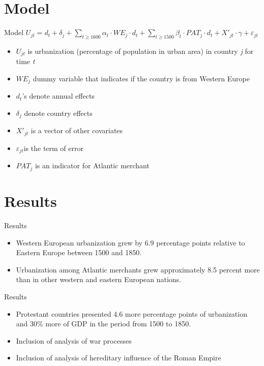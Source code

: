 \documentclass[pdftex,12pt,xcolor=pdftex,table]{beamer}
\theoremstyle{definition}
\theoremstyle{remark}
\numberwithin{equation}{section}
\numberwithin{figure}{section}
\begin{document}
	\section{Model}
		\begin{frame}{Model}
			\justifying
			\centering
			\textit{$U_{jt} = d_{t} + \delta_{j} + \sum_{t\geq1600} \alpha_{t} \cdot WE_{j} \cdot d_{t} +\sum_{t\geq1500} \beta_t\cdot PAT_j \cdot d_t + X'_{jt}\cdot \gamma + \varepsilon_{jt}$} 
			\vspace{0mm} 
		    \begin{itemize}
		        \item \textit{$U_{jt}$} is urbanization (percentage of population in urban area) in country \textit{j} for time \textit{t}
		        \item \textit{$ WE_{j}$} dummy variable that indicates if the country is from Western Europe
		        \item \textit{$ d_{t}$}'s denote annual effects
                \item \textit{$ \delta_{j}$} denote country effects
		        \item \textit{$ X'_{jt}$} is a vector of other covariates
		        \item \textit{$ \varepsilon_{jt}$}is the term of error
		        \item \textit{$ PAT_{j}$} is an indicator for Atlantic merchant
		    \end{itemize}
		\end{frame}
	
	\section{Results}
		\begin{frame}{Results}
			\justifying
			\begin{itemize}
			    \item Western European urbanization grew by 6.9 percentage points relative to Eastern Europe between 1500 and 1850.
			    \vspace{11mm} 
			    \item Urbanization among Atlantic merchants grew approximately 8.5 percent more than in other western and eastern European nations.
			\end{itemize}
		\end{frame}	    
		\begin{frame}{Results}
			\justifying
			\begin{itemize}	    
			    
			    \item Protestant countries presented 4.6 more percentage points of urbanization and 30\% more of GDP in the period from 1500 to 1850.
			    \vspace{7mm} 
			    \item Inclusion of analysis of war processes
			    \vspace{7mm} 
			    \item Inclusion of analysis of hereditary influence of the Roman Empire
			\end{itemize}
		\end{frame}	
\end{document}
